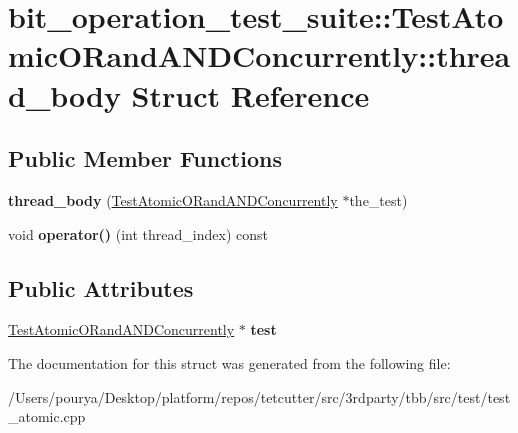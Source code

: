 \hypertarget{structbit__operation__test__suite_1_1TestAtomicORandANDConcurrently_1_1thread__body}{}\section{bit\+\_\+operation\+\_\+test\+\_\+suite\+:\+:Test\+Atomic\+O\+Rand\+A\+N\+D\+Concurrently\+:\+:thread\+\_\+body Struct Reference}
\label{structbit__operation__test__suite_1_1TestAtomicORandANDConcurrently_1_1thread__body}
\subsection*{Public Member Functions}
\begin{DoxyCompactItemize}
\item 
\hypertarget{structbit__operation__test__suite_1_1TestAtomicORandANDConcurrently_1_1thread__body_a6ffd82d4f20ce5e3a35e5e17e90d89b9}{}{\bfseries thread\+\_\+body} (\hyperlink{structbit__operation__test__suite_1_1TestAtomicORandANDConcurrently}{Test\+Atomic\+O\+Rand\+A\+N\+D\+Concurrently} $\ast$the\+\_\+test)\label{structbit__operation__test__suite_1_1TestAtomicORandANDConcurrently_1_1thread__body_a6ffd82d4f20ce5e3a35e5e17e90d89b9}

\item 
\hypertarget{structbit__operation__test__suite_1_1TestAtomicORandANDConcurrently_1_1thread__body_a9f7aafed53d3f5d991872209d718fb00}{}void {\bfseries operator()} (int thread\+\_\+index) const \label{structbit__operation__test__suite_1_1TestAtomicORandANDConcurrently_1_1thread__body_a9f7aafed53d3f5d991872209d718fb00}

\end{DoxyCompactItemize}
\subsection*{Public Attributes}
\begin{DoxyCompactItemize}
\item 
\hypertarget{structbit__operation__test__suite_1_1TestAtomicORandANDConcurrently_1_1thread__body_a28b28e943ae7a1fde64c534be885e312}{}\hyperlink{structbit__operation__test__suite_1_1TestAtomicORandANDConcurrently}{Test\+Atomic\+O\+Rand\+A\+N\+D\+Concurrently} $\ast$ {\bfseries test}\label{structbit__operation__test__suite_1_1TestAtomicORandANDConcurrently_1_1thread__body_a28b28e943ae7a1fde64c534be885e312}

\end{DoxyCompactItemize}


The documentation for this struct was generated from the following file\+:\begin{DoxyCompactItemize}
\item 
/\+Users/pourya/\+Desktop/platform/repos/tetcutter/src/3rdparty/tbb/src/test/test\+\_\+atomic.\+cpp\end{DoxyCompactItemize}
